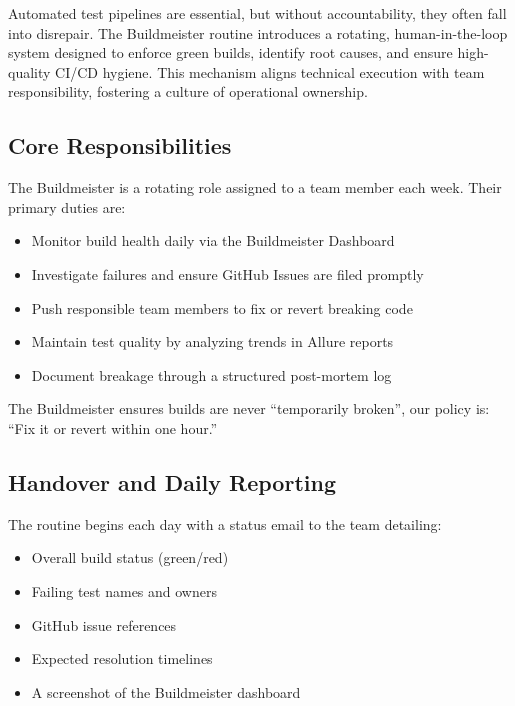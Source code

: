 \documentclass{article}
\begin{document}
Automated test pipelines are essential, but without accountability, they often fall
into disrepair. The Buildmeister routine introduces a rotating, human-in-the-loop
system designed to enforce green builds, identify root causes, and ensure high-quality
CI/CD hygiene. This mechanism aligns technical execution with team
responsibility, fostering a culture of operational ownership.

\subsection{Core Responsibilities}
\label{core-responsibilities}

The Buildmeister is a rotating role assigned to a team member each week. Their primary
duties are:

\begin{itemize}

  \item Monitor build health daily via the Buildmeister Dashboard

  \item Investigate failures and ensure GitHub Issues are filed promptly

  \item Push responsible team members to fix or revert breaking code

  \item Maintain test quality by analyzing trends in Allure reports

  \item Document breakage through a structured post-mortem log
\end{itemize}

The Buildmeister ensures builds are never ``temporarily broken'', our policy is:
``Fix it or revert within one hour.''

\subsection{Handover and Daily Reporting}
\label{handover-and-daily-reporting}

The routine begins each day with a status email to the team detailing:

\begin{itemize}

  \item Overall build status (green/red)

  \item Failing test names and owners

  \item GitHub issue references

  \item Expected resolution timelines

  \item A screenshot of the Buildmeister dashboard
\end{itemize}
\end{document}
